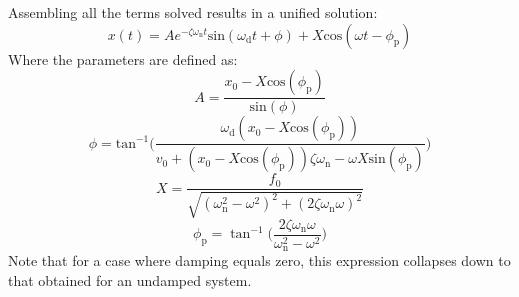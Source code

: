 \documentclass[12pt,letter]{article}
\begin{document}
 Assembling all the terms solved results in a unified solution:
 \begin{equation}
  x(t) = Ae^{-\zeta \omega_\text{n} t}\text{sin}(\omega_\text{d} t + \phi) +  X \text{cos}(\omega t - \phi_\text{p})
  \label{eq:damped_forced_x}
 \end{equation}
 Where the parameters are defined as:
 \begin{equation}
  A = \frac{x_0 -X \text{cos}(\phi_\text{p})}{\text{sin}(\phi)}
 \end{equation}    
 \begin{equation}
  \phi =  \text{tan}^{-1}\bigg(\frac{\omega_\text{d} ( x_0 -X \text{cos}(\phi_\text{p}))}{v_0 + (x_0 - X \text{cos}(\phi_\text{p})) \zeta \omega_\text{n} - \omega X \text{sin}(\phi_\text{p}) }\bigg)
 \end{equation} 
 \begin{equation}
  X = \frac{f_0}{\sqrt{(\omega_\text{n}^2 - \omega^2)^2 +  (2\zeta \omega_\text{n} \omega)^2}} 
 \end{equation} 
 \begin{equation}
  \phi_\text{p} = \tan^{-1} \bigg(\frac{2\zeta \omega_\text{n} \omega}{\omega_\text{n}^2 - \omega^2}\bigg)
  \label{eq:damped_forced_theta_p}
 \end{equation}  
 Note that for a case where damping equals zero, this expression collapses down to that obtained for an undamped system.
\end{document}
